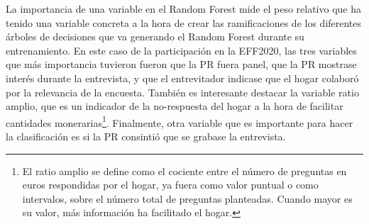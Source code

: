 La importancia de una variable en el Random Forest mide el peso relativo que ha tenido una variable concreta a la hora de crear las ramificaciones de los diferentes árboles de decisiones que va generando el Random Forest durante su entrenamiento. En este caso de la participación en la EFF2020, las tres variables que más importancia tuvieron fueron que la PR fuera panel, que la PR mostrase interés durante la entrevista, y que el entrevitador indicase que el hogar colaboró por la relevancia de la encuesta. También es interesante destacar la variable ratio amplio, que es un indicador de la no-respuesta del hogar a la hora de facilitar cantidades monerarias\footnote{El ratio amplio se define como el cociente entre el número de preguntas en euros respondidas por el hogar, ya fuera como valor puntual o como intervalos, sobre el número total de preguntas planteadas. Cuando mayor es su valor, más información ha facilitado el hogar.}. Finalmente, otra variable que es importante para hacer la clasificación es si la PR consintió que se grabase la entrevista.